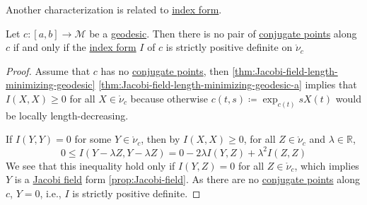 Another characterization is related to \hyperref[def:index-form]{index form}.

\begin{lemma}\label{lma:conjugate-point-index-form}
	Let \(c\colon [a, b] \to \mathcal{M} \) be a \hyperref[def:geodesic]{geodesic}. Then there is no pair of \hyperref[def:conjugate-point]{conjugate points} along \(c\) if and only if the \hyperref[def:index-form]{index form} \(I\) of \(c\) is strictly positive definite on \(\mathring{\nu}_c\)
\end{lemma}
\begin{proof}\let\qed\relax
	Assume that \(c\) has no \hyperref[def:conjugate-point]{conjugate points}, then \autoref{thm:Jacobi-field-length-minimizing-geodesic} \autoref{thm:Jacobi-field-length-minimizing-geodesic-a} implies that
	\(I(X, X) \geq 0\) for all \(X \in \mathring{\nu }_c\) because otherwise \(c(t, s)\coloneqq \exp _{c(t)} s X(t)\) would be locally length-decreasing.

	If \(I(Y, Y) = 0\) for some \(Y\in \mathring{\nu }_c\), then by \(I(X, X ) \geq 0\), for all \(Z\in \mathring{\nu }_c\) and \(\lambda \in \mathbb{R} \),
	\[
		0 \leq I(Y - \lambda Z, Y - \lambda Z) = 0 - 2\lambda I(Y, Z) + \lambda ^2 I(Z, Z)
	\]
	We see that this inequality hold only if \(I(Y, Z) = 0\) for all \(Z\in \mathring{\nu }_c\), which implies \(Y\) is a \hyperref[def:Jacobi-field]{Jacobi field} form \autoref{prop:Jacobi-field}. As there are no \hyperref[def:conjugate-point]{conjugate points} along \(c\), \(Y = 0\), i.e., \(I\) is strictly positive definite.
\end{proof}